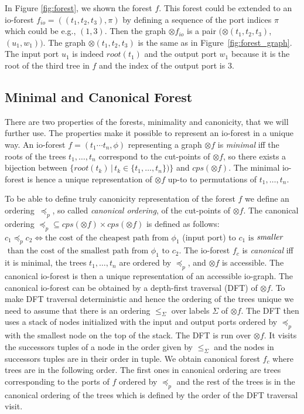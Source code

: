 In Figure \ref{fig:forest}, we shown the forest $f$.
This forest could be extended to an io-forest $f_{io}=((t_1,t_2,t_3),\pi)$ 
by defining a sequence of the port indices $\pi$ which could be e.g., $(1,3)$.
Then the graph $\otimes f_{io}$ is a pair $(\otimes (t_1,t_2,t_3)$, $(u_1,w_1))$.
The graph $\otimes (t_1,t_2,t_3)$ is the same as in Figure~\ref{fig:forest_graph}.
The input port $u_1$ is indeed $root(t_1)$
and the output port $w_1$ because it is the root of the third tree in $f$
and the index of the output port is $3$.
\label{ex:iograph}
\eexmp

\subsection{Minimal and Canonical Forest}
\label{subsec:mcforest}

There are two properties of the forests, minimality and canonicity, that we will further use.
The properties make it possible to represent an io-forest in a unique way.
An io-forest $f=(t_1 \cdots t_n, \phi)$ representing a graph $\otimes f$ is \emph{minimal}
iff the roots of the trees $t_1,\ldots,t_n$ correspond to the cut-points of $\otimes f$,
so there exists a bijection between $\{root(t_k)\,|\, t_k \in \{t_1, \ldots, t_n\} )\}$ and $cps(\otimes f)$.
The minimal io-forest is hence a unique representation of $\otimes f$ up-to to permutations of $t_1,\ldots,t_n$.

To be able to define truly canonicity representation of the forest $f$
we define an ordering~$\preceq_p$, so called \emph{canonical ordering}, of the cut-points of $\otimes f$.
The canonical ordering ${\preceq_p} \subseteq {cps(\otimes f) \times cps(\otimes f)}$
is defined as follows: $c_1 \preceq_p c_2 \Leftrightarrow \text{the cost of the cheapest path from }
\phi_1$ (input port) to $c_1 \text{ is}$ $\emph{smaller}$ $\text{ than the cost of the smallest path from } \phi_1 \text{ to } c_2$.
The io-forest $f_c$ is \emph{canonical} iff it is minimal, the trees $t_1,\ldots, t_n$ are ordered by $\preceq_p$, and $\otimes f$ is accessible.
The canonical io-forest is then a unique representation of an accessible io-graph.
The canonical io-forest can be obtained by a depth-first traversal (DFT)\cite{taocp} of $\otimes f$.
To make DFT traversal deterministic and hence the ordering of the trees unique
we need to assume that there is an ordering $\leq_\Sigma$ over labels $\Sigma$ of $\otimes f$.
The DFT then uses a stack of nodes initialized with the input and output ports
ordered by $\preceq_p$ with the smallest node on the top of the stack.
The DFT is run over $\otimes f$.
It visits the successors tuples of a node in the order given by $\leq_{\Sigma}$ and
the nodes in successors tuples are in their order in tuple.
We obtain canonical forest $f_c$ where trees are in the following order.
The first ones in canonical ordering are trees corresponding
to the ports of $f$ ordered by $\preceq_p$ and the rest of
the trees is in the canonical ordering of the trees
which is defined by the order of the DFT traversal visit.


